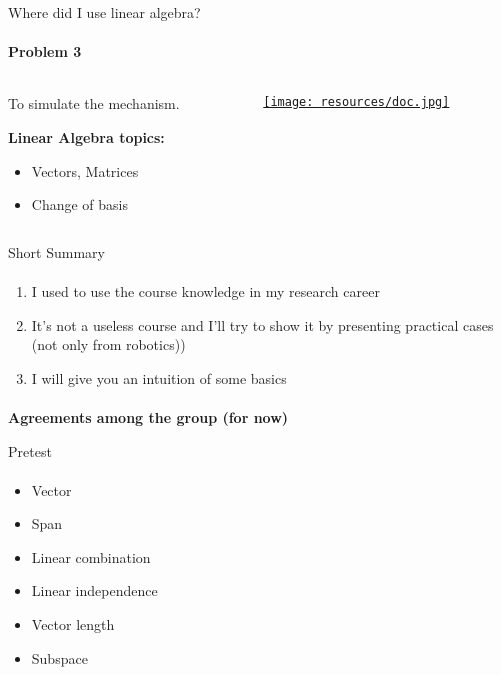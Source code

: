 \documentclass[aspectratio=169,notes]{beamer}
\begin{document}
\begin{frame}[t]{Where did I use linear algebra?}
    \framesubtitle{Problem 3}
    \vspace{-0.3cm}
    \begin{columns}[T,onlytextwidth]
        \begin{column}{0.34\textwidth}
            To simulate the mechanism. \medskip

            \textbf{Linear Algebra topics:}
            \begin{itemize}
                \item Vectors, Matrices
                \item Change of basis
            \end{itemize}
        \end{column}
        \begin{column}{0.64\textwidth}
            \vspace{-0.4cm}
            \begin{figure}[H]
                \href{https://disk.yandex.ru/i/t3GcFJG_IiqgfA}{
                    \centering\texttt{[image: resources/doc.jpg]}}
                \label{fig:resources/doc.jpg}
            \end{figure}
        \end{column}
    \end{columns}
\end{frame}

\begin{frame}[t]{Short Summary}
    \framesubtitle{}
    \begin{enumerate}
        \item I used to use the course knowledge in my research career
        \item It's not a useless course and I'll try to show it by presenting practical cases (not only from robotics))
        \item I will give you an intuition of some basics
    \end{enumerate}
\end{frame}

\begin{frame}[c]{}
    \framesubtitle{}
    \centering\LARGE
    \textbf{Agreements among the group (for now)}
\end{frame}

\begin{frame}[t]{Pretest}
    \framesubtitle{}
    \LARGE
    \begin{multicols}{2}
        \begin{itemize}
            \item Vector
            \item Span
            \item Linear combination
            \item Linear independence
            \item Vector length
            \item Subspace
        \end{itemize}
    \end{multicols}
\end{frame}
\end{document}

